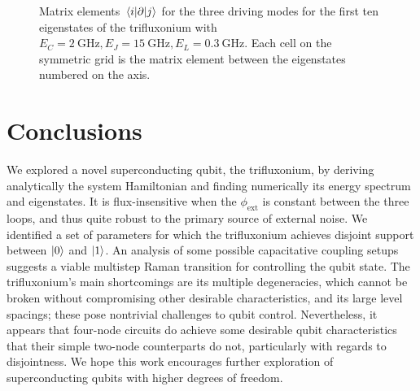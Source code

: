 \documentclass[11pt]{article}
\begin{document}
\begin{figure}[H]
	\centering
	\caption{Matrix elements $\matrixel{i}{\partial}{j}$ for the three driving modes for the first ten eigenstates of the trifluxonium with $E_C = \SI{2}{\giga\hertz}, E_J = \SI{15}{\giga\hertz}, E_L = \SI{0.3}{\giga\hertz}$. Each cell on the symmetric grid is the matrix element between the eigenstates numbered on the axis.}
	\label{fig_dipole}
\end{figure}

\section{Conclusions}

We explored a novel superconducting qubit, the trifluxonium, by deriving analytically the system Hamiltonian and finding numerically its energy spectrum and eigenstates. It is flux-insensitive when the $\phi_\text{ext}$ is constant between the three loops, and thus quite robust to the primary source of external noise. We identified a set of parameters for which the trifluxonium achieves disjoint support between $\ket{0}$ and $\ket{1}$. An analysis of some possible capacitative coupling setups suggests a viable multistep Raman transition for controlling the qubit state. The trifluxonium's main shortcomings are its multiple degeneracies, which cannot be broken without compromising other desirable characteristics, and its large level spacings; these pose nontrivial challenges to qubit control. Nevertheless, it appears that four-node circuits do achieve some desirable qubit characteristics that their simple two-node counterparts do not, particularly with regards to disjointness. We hope this work encourages further exploration of superconducting qubits with higher degrees of freedom.
\end{document}

